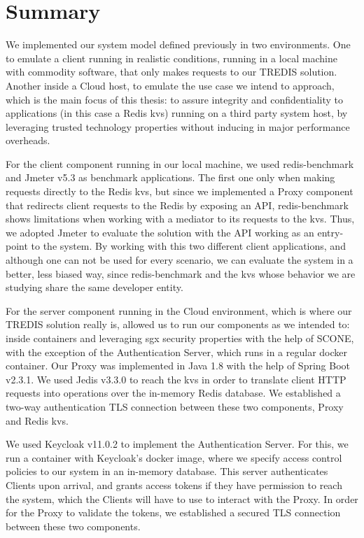 \section{Summary}
\label{sec:implementationSummary}

We implemented our system model defined previously in two environments. 
One to emulate a client running in realistic conditions, running in a local machine with commodity software, that only makes requests to our TREDIS solution. Another inside a Cloud host, to emulate the use case we intend to approach, which is the main focus of this thesis: to assure integrity and confidentiality to applications (in this case a Redis \gls{kvs}) running on a third party system host, by leveraging trusted technology properties without inducing in major performance overheads.

For the client component running in our local machine, we used redis-benchmark and Jmeter v5.3 as benchmark applications. 
The first one only when making requests directly to the Redis \gls{kvs}, but since we implemented a Proxy component that redirects client requests to the Redis by exposing an API, redis-benchmark shows limitations when working with a mediator to its requests to the \gls{kvs}. Thus, we adopted Jmeter to evaluate the solution with the API working as an entry-point to the system. By working with this two different client applications, and although one can not be used for every scenario, we can evaluate the system in a better, less biased way, since redis-benchmark and the \gls{kvs} whose behavior we are studying share the same developer entity.

For the server component running in the Cloud environment, which is where our TREDIS solution really is, allowed us to run our components as we intended to: inside containers and leveraging \gls{sgx} security properties with the help of SCONE, with the exception of the Authentication Server, which runs in a regular docker container. 
Our Proxy was implemented in Java 1.8 with the help of Spring Boot v2.3.1. We used Jedis v3.3.0 to reach the \gls{kvs} in order to translate client HTTP requests into operations over the in-memory Redis database. We established a two-way authentication TLS connection between these two components, Proxy and Redis \gls{kvs}.

We used Keycloak v11.0.2 to implement the Authentication Server. For this, we run a container with Keycloak's docker image, where we specify access control policies to our system in an in-memory database. This server authenticates Clients upon arrival, and grants access tokens if they have permission to reach the system, which the Clients will have to use to interact with the Proxy. In order for the Proxy to validate the tokens, we established a secured TLS connection between these two components.

